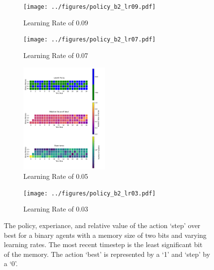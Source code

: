 \documentclass[a4paper]{article}
\begin{document}
\begin{figure}[ht]
    \centering
    \begin{subfigure}[b]{0.24\textwidth}
        \centering
        \texttt{[image: ../figures/policy\_b2\_lr09.pdf]}
        \caption{Learning Rate of 0.09}
        \label{2_b2_lr09}
    \end{subfigure}
    \begin{subfigure}[b]{0.24\textwidth}
        \centering
        \texttt{[image: ../figures/policy\_b2\_lr07.pdf]}
        \caption{Learning Rate of 0.07}
        \label{2_b2_lr07}
    \end{subfigure}
    \begin{subfigure}[b]{0.24\textwidth}
        \centering
        \includegraphics[width=12em]{../figures/policy_b2_lr05.pdf}
        \caption{Learning Rate of 0.05}
        \label{2_b2_lr05}
    \end{subfigure}
    \begin{subfigure}[b]{0.24\textwidth}
        \centering
        \texttt{[image: ../figures/policy\_b2\_lr03.pdf]}
        \caption{Learning Rate of 0.03}
        \label{2_b2_lr03}
    \end{subfigure}
    \caption{
        The policy, experiance, and relative value of the action `step'
        over best for a binary agents with a memory size of two bits
        and varying learning rates. The most recent timestep
        is the least significant bit of the memory.
        The action `best' is represented by a `1' and `step' by a `0'.
    }
    \label{policy_2_b2}
\end{figure}
\end{document}
